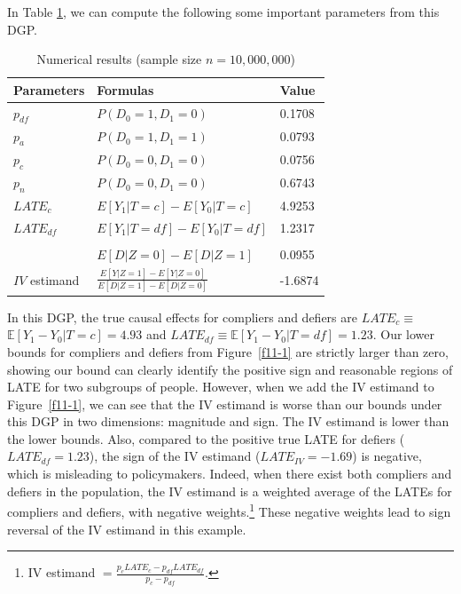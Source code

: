 \documentclass[12pt]{article}
\theoremstyle{plain}
\theoremstyle{definition}
\theoremstyle{remark}
\begin{document}
In Table \ref{dgp3}, we can compute the following some important parameters from this DGP.
\begin{table}
	\centering
	\begin{tabular}{lll}
		\toprule
		Parameters & Formulas   & Value                \\ \midrule
		$p_{df}$          & $P(D_0=1, D_1=0)$      &     0.1708           \\
		$p_a$          & $P(D_0=1, D_1=1)$    &  0.0793  \\
		$p_c$          & $P(D_0=0, D_1=0)$ &  0.0756          \\
		$p_n$          & $P(D_0=0, D_1=0)$   & 0.6743\\
  	$LATE_c$     & $E[Y_1 \vert T=c] - E[Y_0 \vert T=c] $   &   4.9253 \\
		$LATE_{df}$      & $E[Y_1 \vert T=df] - E[Y_0 \vert T=df] $  &  1.2317   \\
              &&\\
& $E[D \vert Z=0]-E[D \vert Z=1]$ & 0.0955 \\
$IV$ estimand & $\frac{E[Y \vert Z=1]-E[Y \vert Z=0]}{E[D \vert Z=1]-E[D \vert Z=0]}$ &  -1.6874 \\
 \bottomrule 
	\end{tabular}
\caption{Numerical results (sample size $n = 10,000,000$)}
\label{dgp3}
\end{table}
In this DGP, the true causal effects for compliers and defiers are $L A T E_c \equiv$ $\mathbb{E}\left[Y_1-Y_0  \vert  T=c\right]=4.93$ and $L A T E_{d f} \equiv \mathbb{E}\left[Y_1-Y_0  \vert  T=d f\right]=1.23$. Our lower bounds for compliers and defiers from Figure~\ref{f11-1}  are strictly larger than zero, showing our bound can clearly identify the positive sign and reasonable regions of LATE for two subgroups of people. However, when we add the IV estimand to Figure~\ref{f11-1}, we can see that the IV estimand is worse than our bounds under this DGP in two dimensions: magnitude and sign. The IV estimand is lower than the lower bounds. Also, compared to the positive true LATE for defiers ($LATE_{df}= 1.23$), the sign of the IV estimand ($LATE_{IV}=  -1.69$) is negative, which is misleading to policymakers. Indeed, when there exist both compliers and defiers in the population, the IV estimand is a weighted average of the LATEs for compliers and defiers, with negative weights.\footnote{IV estimand $=\frac{p_c LATE_c -p_{df} LATE_{df}}{p_c-p_{df}}$.} These negative weights lead to sign reversal of the IV estimand in this example. 
\end{document}

